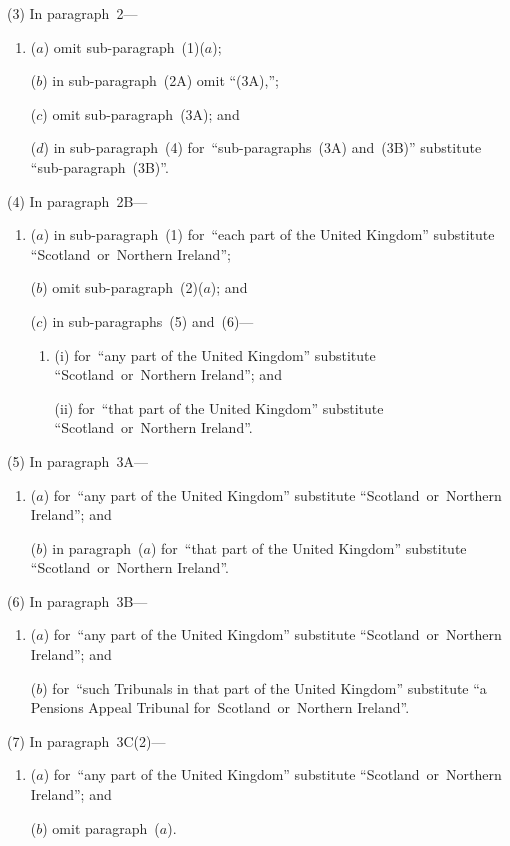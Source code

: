 \documentclass[12pt,a4paper]{article}
\begin{document}
(3) In paragraph~2—
\begin{enumerate}\item[]
($a$) omit sub-paragraph~(1)($a$);

($b$) in sub-paragraph~(2A) omit “(3A),”;

($c$) omit sub-paragraph~(3A); and

($d$) in sub-paragraph~(4) for~“sub-paragraphs~(3A) and~(3B)” substitute “sub-paragraph~(3B)”.
\end{enumerate}

(4) In paragraph~2B—
\begin{enumerate}\item[]
($a$) in sub-paragraph~(1) for~“each part of the United Kingdom” substitute “Scotland~or~Northern Ireland”;

($b$) omit sub-paragraph~(2)($a$); and

($c$) in sub-paragraphs~(5) and~(6)—
\begin{enumerate}\item[]
(i) for~“any part of the United Kingdom” substitute “Scotland~or~Northern Ireland”; and

(ii) for~“that part of the United Kingdom” substitute “Scotland~or~Northern Ireland”.
\end{enumerate}
\end{enumerate}

(5) In paragraph~3A—
\begin{enumerate}\item[]
($a$) for~“any part of the United Kingdom” substitute “Scotland~or~Northern Ireland”; and

($b$) in paragraph~($a$)  for~“that part of the United Kingdom” substitute “Scotland~or~Northern Ireland”.
\end{enumerate}

(6) In paragraph~3B—
\begin{enumerate}\item[]
($a$) for~“any part of the United Kingdom” substitute “Scotland~or~Northern Ireland”; and

($b$) for~“such Tribunals in that part of the United Kingdom” substitute “a Pensions Appeal Tribunal for~Scotland~or~Northern Ireland”.
\end{enumerate}

(7) In paragraph~3C(2)—
\begin{enumerate}\item[]
($a$) for~“any part of the United Kingdom” substitute “Scotland~or~Northern Ireland”; and

($b$) omit paragraph~($a$).
\end{enumerate}
\end{document}

